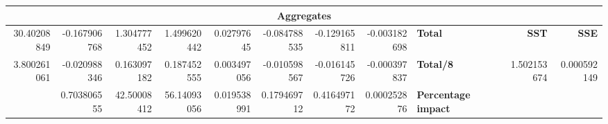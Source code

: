 \documentclass[11pt,a4paper]{article}
\begin{document}
{\begin{landscape}
{\begin{tabular}{|*{15}{r|}}
                \hline\multicolumn{15}{|c|}{\textbf{Aggregates}} \\
                \hline 30.40208849 & -0.167906768 & 1.304777452 & 1.499620442 & 0.02797645 & -0.084788535 & -0.129165811 & -0.003182698 & \multicolumn{3}{|l|}{\textbf{Total}} & \multicolumn{2}{|r|}{} & \textbf{SST} & \textbf{SSE} \\
                \hline 3.800261061 & -0.020988346 & 0.163097182 & 0.187452555 & 0.003497056 & -0.010598567 & -0.016145726 & -0.000397837 & \multicolumn{3}{|l|}{\textbf{Total/8}} & \multicolumn{2}{|r|}{} & 1.502153674 & 0.000592149 \\
                \hline & 0.703806555 & 42.50008412 & 56.14093056 & 0.019538991 & 0.179469712 & 0.416497172 & 0.000252876 & \multicolumn{3}{|l|}{\textbf{Percentage impact}} & \multicolumn{4}{|l|}{} \\
                \hline
            \end{tabular}
        }
        \label{table::wo_2k_through}

        \vspace{2cm}


\end{landscape}}
\end{document}
